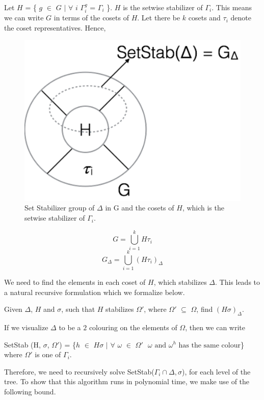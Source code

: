 Let $H$ = \{ $g$ $\in$ $G$ $|$ $\forall$ $i$ $\Gamma_{i}^{g}$ = $\Gamma_{i}$ \}. $H$ is the setwise stabilizer of $\Gamma_{i}$. This means we can write $G$ in terms of the cosets of $H$. Let there be $k$ cosets and $\tau_i$ denote the coset representatives. Hence,
\begin{figure}[htp!]
	\centering
	\includegraphics[scale=0.45]{images/setstabgroup.pdf}
	\caption{Set Stabilizer group of $\Delta$ in G and the cosets of $H$, which is the setwise stabilizer of $\Gamma_{i}$.}
	\label{fig:setstabgroup}
\end{figure}

\[ G =  \bigcup_{i=1}^kH\tau_{i} \]
\[ G_{\Delta} = \bigcup_{i=1}^k(H\tau_{i})_{\Delta} \]

We need to find the elements in each coset of $H$, which stabilizes $\Delta$. This leads to a natural recursive formulation which we formalize below. 

\begin{problem}
Given $\Delta$, $H$ and $\sigma$, such that $H$ stabilizes $\Omega'$, where $\Omega'$ $\subseteq$ $\Omega$, find $(H\sigma)_{\Delta}$. 
\end{problem}
If we visualize $\Delta$ to be a $2$ colouring on the elements of $\Omega$, then we can write
\begin{center}
SetStab (H, $\sigma$, $\Omega'$) = \{$h$ $\in$ $H\sigma$ $|$ $\forall$ $\omega$ $\in$ $\Omega' \text{ $\omega$ and $\omega^{h}$ has the same colour}$\}
where $\Omega'$ is one of $\Gamma_{i}$.
\end{center}

Therefore, we need to recursively solve SetStab($\Gamma_{i} \cap \Delta, \sigma$), for each level of the tree. To show that this algorithm runs in polynomial time, we make use of the following bound.

